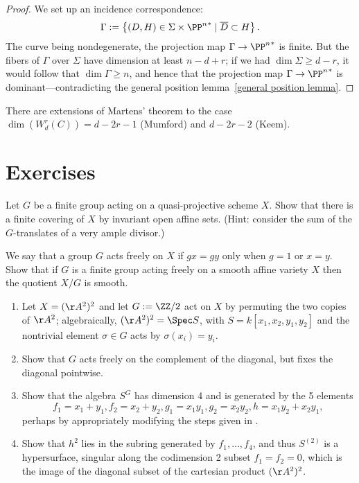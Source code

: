 \begin{proof}
We set up an incidence correspondence: 
$$
\Gamma := \left\{ (D, H) \in \Sigma \times {\PP^n}^* \mid \overline D \subset H \right\}.
$$
The curve being nondegenerate, the projection map $\Gamma \to  {\PP^n}^*$ is finite. But the fibers of $\Gamma$ over $\Sigma$ have dimension at least $n-d+r$; if we had $\dim \Sigma \geq d-r$, it would follow that $\dim \Gamma \geq n$, and hence that the projection map $\Gamma \to  {\PP^n}^*$ is dominant---contradicting the general position lemma~\ref{general position lemma}.
\end{proof}

There are extensions of Martens' theorem to the case $\dim(W^r_d(C)) = d-2r-1$ (Mumford) and $d-2r-2$ (Keem).

\section{Exercises}

\begin{exercise}
 Let $G$ be a finite group acting on a quasi-projective scheme $X$. Show that there is a finite covering of $X$ by invariant open affine sets. (Hint: consider the sum of the $G$-translates of a very ample divisor.)
\end{exercise}

\begin{exercise}\label{free actions}
We say that a group $G$ acts freely on $X$ if $gx = gy$ only when $g =1$ or $x=y$. Show that
 if $G$ is a finite group acting freely on a smooth affine variety $X$ then the quotient $X/G$ is smooth.
\end{exercise}

\begin{exercise}
 \label{sym2A2} 
 \begin{enumerate}
 \item Let $X = (\AA^{2})^{2}$ and let $G := \ZZ/2$ act on $X$ by permuting the two copies of  $\AA^{2}$; algebraically,
$(\AA^{2})^{2} = \Spec S$, with $S = k[x_{1},x_{2}, y_{1}, y_{2}]$ and the nontrivial element $\sigma\in G$ acts by
$\sigma(x_{i}) = y_{i}$. 
\item Show that $G$ acts freely on the complement of the diagonal, but fixes the diagonal pointwise.
\item Show that the algebra $S^{G}$ has dimension 4 and is generated by the 5 elements
$$ 
f_{1} = x_{1}+y_{1}, f_{2} = x_{2}+y_{2}, g_{1} = x_{1}y_{1}, g_{2} = x_{2}y_{2}, h = x_{1}y_{2}+x_{2}y_{1},
$$
perhaps by appropriately modifying the steps given in \cite[Exercise 1.6]{Eisenbud1995}. 
\item Show that $h^2$ lies in the subring generated by $f_1,\dots, f_4$, and thus $S^{(2)}$ is a hypersurface, singular
along the  codimension 2 subset $f_{1} = f_{2} = 0$, which is the image of the diagonal subset of the 
cartesian product $(\AA^{2})^{2}$.
\end{enumerate}
\end{exercise}

